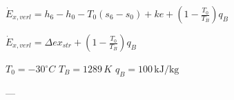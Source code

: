 \( \dot{E}_{x, verl} = h_6 - h_0 - T_0(s_6 - s_0) + ke + \left(1 - \frac{T_0}{T_B}\right) q_B \)  

\( \dot{E}_{x, verl} = \Delta ex_{str} + \left(1 - \frac{T_0}{T_B}\right) q_B \)  

\( T_0 = -30^\circ C \)  
\( T_B = 1289 \, K \)  
\( q_B = 100 \, \text{kJ/kg} \)  

---